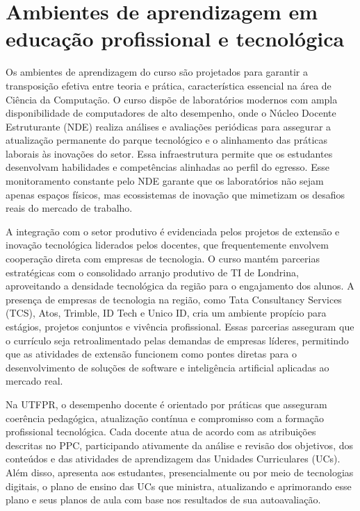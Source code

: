 \section{Ambientes de aprendizagem em educação profissional e tecnológica}

Os ambientes de aprendizagem do curso são projetados para garantir a transposição efetiva entre teoria e prática, característica essencial na área de Ciência da Computação. O curso dispõe de laboratórios modernos com ampla disponibilidade de computadores de alto desempenho, onde o Núcleo Docente Estruturante (NDE) realiza análises e avaliações periódicas para assegurar a atualização permanente do parque tecnológico e o alinhamento das práticas laborais às inovações do setor. Essa infraestrutura permite que os estudantes desenvolvam habilidades e competências alinhadas ao perfil do egresso. Esse monitoramento constante pelo NDE garante que os laboratórios não sejam apenas espaços físicos, mas ecossistemas de inovação que mimetizam os desafios reais do mercado de trabalho.

A integração com o setor produtivo é evidenciada pelos projetos de extensão e inovação tecnológica liderados pelos docentes, que frequentemente envolvem cooperação direta com empresas de tecnologia. O curso mantém parcerias estratégicas com o consolidado arranjo produtivo de TI de Londrina, aproveitando a densidade tecnológica da região para o engajamento dos alunos. A presença de empresas de tecnologia na região, como Tata Consultancy Services (TCS), Atos, Trimble, ID Tech e Unico ID, cria um ambiente propício para estágios, projetos conjuntos e vivência profissional. Essas parcerias asseguram que o currículo seja retroalimentado pelas demandas de empresas líderes, permitindo que as atividades de extensão funcionem como pontes diretas para o desenvolvimento de soluções de software e inteligência artificial aplicadas ao mercado real.

Na UTFPR, o desempenho docente é orientado por práticas que asseguram coerência pedagógica, atualização contínua e compromisso com a formação profissional tecnológica. Cada docente atua de acordo com as atribuições descritas no PPC, participando ativamente da análise e revisão dos objetivos, dos conteúdos e das atividades de aprendizagem das Unidades Curriculares (UCs). Além disso, apresenta aos estudantes, presencialmente ou por meio de tecnologias digitais, o plano de ensino das UCs que ministra, atualizando e aprimorando esse plano e seus planos de aula com base nos resultados de sua autoavaliação.

